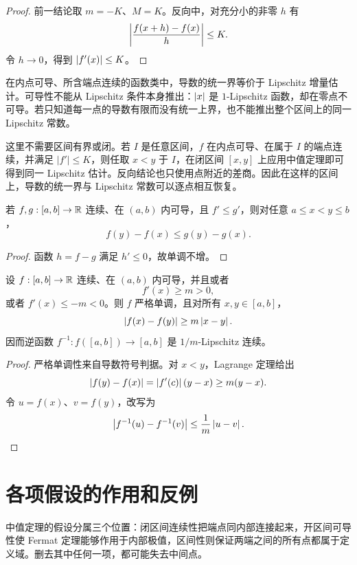 \begin{proof}
前一结论取 \(m=-K\)、\(M=K\)。反向中，对充分小的非零 \(h\) 有
\[
 \left|\frac{f(x+h)-f(x)}{h}\right|\le K.
\]
令 \(h\to0\)，得到 \(\left|f'(x)\right|\le K\)。
\end{proof}

在内点可导、所含端点连续的函数类中，导数的统一界等价于 Lipschitz 增量估计。可导性不能从 Lipschitz 条件本身推出：\(\left|x\right|\) 是 \(1\)-Lipschitz 函数，却在零点不可导。若只知道每一点的导数有限而没有统一上界，也不能推出整个区间上的同一 Lipschitz 常数。

这里不需要区间有界或闭。若 \(I\) 是任意区间，\(f\) 在内点可导、在属于 \(I\) 的端点连续，并满足 \(|f'|\le K\)，则任取 \(x<y\) 于 \(I\)，在闭区间 \([x,y]\) 上应用中值定理即可得到同一 Lipschitz 估计。反向结论也只使用点附近的差商。因此在这样的区间上，导数的统一界与 Lipschitz 常数可以逐点相互恢复。

\begin{corollary}[导数比较]
\label{cor:derivative-comparison}
若 \(f,g:[a,b]\to\mathbb{R}\) 连续、在 \((a,b)\) 内可导，且 \(f'\le g'\)，则对任意 \(a\le x<y\le b\)，
\[
 f(y)-f(x)\le g(y)-g(x).
\]
\end{corollary}

\begin{proof}
函数 \(h=f-g\) 满足 \(h'\le0\)，故单调不增。
\end{proof}

\begin{proposition}[下导数界与逆向距离估计]
\label{prop:lower-derivative-inverse-lipschitz}
设 \(f:[a,b]\to\mathbb{R}\) 连续、在 \((a,b)\) 内可导，并且或者
\[
 f'(x)\ge m>0,
\]
或者 \(f'(x)\le-m<0\)。则 \(f\) 严格单调，且对所有 \(x,y\in[a,b]\)，
\[
 \left|f(x)-f(y)\right|\ge m\left|x-y\right|.
\]
因而逆函数 \(f^{-1}:f([a,b])\to[a,b]\) 是 \(1/m\)-Lipschitz 连续。
\end{proposition}

\begin{proof}
严格单调性来自导数符号判据。对 \(x<y\)，Lagrange 定理给出
\[
 \left|f(y)-f(x)\right|=\left|f'(c)\right|(y-x)\ge m(y-x).
\]
令 \(u=f(x)\)、\(v=f(y)\)，改写为
\[
 \left|f^{-1}(u)-f^{-1}(v)\right|
 \le\frac1m\left|u-v\right|.
\]
\end{proof}

\section{各项假设的作用和反例}
\label{sec:mvt-hypotheses-counterexamples}

中值定理的假设分属三个位置：闭区间连续性把端点同内部连接起来，开区间可导性使 Fermat 定理能够作用于内部极值，区间性则保证两端之间的所有点都属于定义域。删去其中任何一项，都可能失去中间点。

